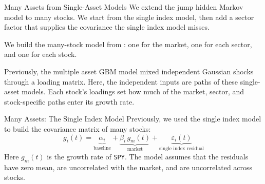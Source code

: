 \documentclass[aspectratio=169,11pt]{beamer}
\begin{document}
\begin{frame}{Many Assets from Single-Asset Models}
  We extend the jump hidden Markov model to many stocks. We start from the single index model,
  then add a sector factor that supplies the covariance the single index model misses.

  \vspace{0.5em}
  We build the many-stock model from : one for the
  market, one for each sector, and one for each stock.

  \vspace{0.5em}
  Previously, the multiple asset GBM model mixed independent Gaussian shocks through a loading
  matrix. Here, the independent inputs are paths of these single-asset models. Each stock's
  loadings set how much of the market, sector, and stock-specific paths enter its growth rate.
\end{frame}

\begin{frame}{Many Assets: The Single Index Model}
  Previously, we used the single index model to build the covariance matrix of many stocks:
  \begin{equation*}
    g_{i}(t)=\underbrace{\alpha_{i}}_{\textstyle\text{baseline}}+\underbrace{\beta_{i}\,g_{m}(t)}_{\textstyle\text{market}}+\underbrace{\varepsilon_{i}(t)}_{\textstyle\text{single index residual}}
  \end{equation*}
  Here $g_m(t)$ is the growth rate of \texttt{SPY}. The model assumes that the residuals have
  zero mean, are uncorrelated with the market, and are uncorrelated across stocks.
\end{frame}
\end{document}
